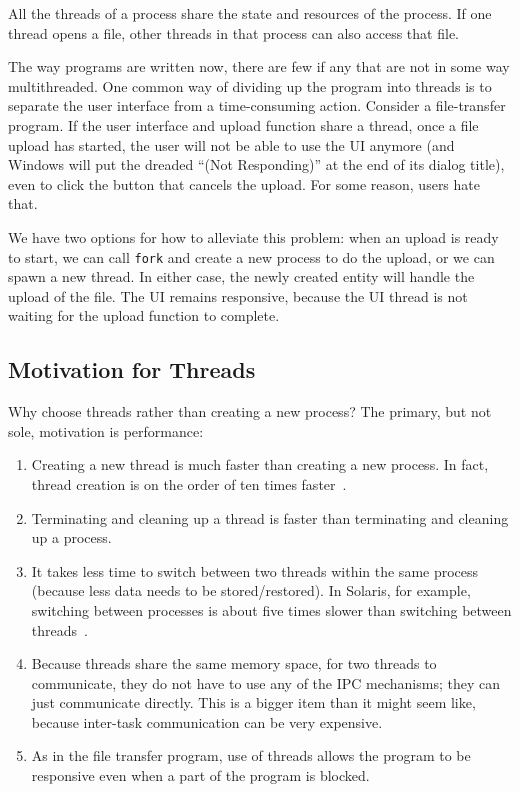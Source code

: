 All the threads of a process share the state and resources of the process. If one thread opens a file, other threads in that process can also access that file.

The way programs are written now, there are few if any that are not in some way multithreaded. One common way of dividing up the program into threads is to separate the user interface from a time-consuming action. Consider a file-transfer program. If the user interface and upload function share a thread, once a file upload has started, the user will not be able to use the UI anymore (and Windows will put the dreaded ``(Not Responding)'' at the end of its dialog title), even to click the button that cancels the upload. For some reason, users hate that.

We have two options for how to alleviate this problem: when an upload is ready to start, we can call \texttt{fork} and create a new process to do the upload, or we can spawn a new thread. In either case, the newly created entity will handle the upload of the file. The UI remains responsive, because the UI thread is not waiting for the upload function to complete.

\subsection*{Motivation for Threads}

Why choose threads rather than creating a new process? The primary, but not sole, motivation is performance:
\begin{enumerate}
	\item Creating a new thread is much faster than creating a new process. In fact, thread creation is on the order of ten times faster~\cite{machThreads}.
	\item Terminating and cleaning up a thread is faster than terminating and cleaning up a process.
	\item It takes less time to switch between two threads within the same process (because less data needs to be stored/restored). In Solaris, for example, switching between processes is about five times slower than switching between threads~\cite{osc}.
	\item Because threads share the same memory space, for two threads to communicate, they do not have to use any of the IPC mechanisms; they can just communicate directly. This is a bigger item than it might seem like, because inter-task communication can be very expensive.
	\item As in the file transfer program, use of threads allows the program to be responsive even when a part of the program is blocked.
\end{enumerate}

